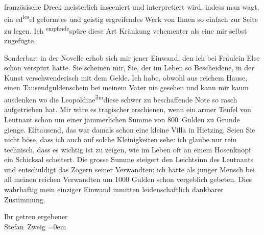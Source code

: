               französische Dreck meisterlich insceniert und interpretiert wird, indess man wagt,
               ein ed\substVorne{}\textsuperscript{les}\substDazwischen{}el\substHinten{} geformtes und geistig ergreifendes Werk von Ihnen so einfach zur Seite zu
               legen. Ich \substVorne{}\textsuperscript{empfinde}\substDazwischen{}spüre\substHinten{} diese Art Kränkung vehementer als eine mir selbst zugefügte.\pend
           
\pstart
           Sonderbar: in der Novelle
               erhob sich mir jener Einwand, den ich bei Fräulein
                  Else schon verspürt hatte. Sie scheinen mir, Sie, der im Leben so
               Bescheidene, in der Kunst verschwenderisch mit dem Gelde. Ich habe, obwohl aus
               reichem Hause, einen Tausendguldenschein \introOben{}bei meinem Vater\introOben{}
               nie gesehen und kann mir kaum ausdenken wo die Leopoldine\substVorne{}\textsuperscript{ihn}\substDazwischen{}diese schwer zu beschaffende Note so rasch\substHinten{} aufgetrieben hat. Mir wäre es tragischer erschienen, wenn ein armer Teufel
               von Leutnant schon um einer jämmerlichen Summe von 800 Gulden zu Grunde gienge.
               Elftausend, das war damals schon eine \introOben{}kleine\introOben{} Villa in Hietzing. Seien Sie nicht böse, dass ich \introOben{}auch\introOben{} auf solche Kleinigkeiten
               sehe: ich glaube nur rein technisch, dass es wichtig ist zu zeigen, wie im Leben oft
               an einem Hosenknopf ein Schicksal scheitert. Die grosse Summe steigert den Leichtsinn
               des Leutnants und entschuldigt das Zögern seiner Verwandten: ich hätte als junger
               Mensch bei all meinen reichen Verwandten um 1000 Gulden schon vergeblich gebeten.
               Dies wahrhaftig mein einziger Einwand inmitten leidenschaftlich dankbarer
               Zustimmung.\pend
           
\pstart
           Ihr getreu ergebener{\\[\baselineskip]}\spacefill\mbox{Stefan Zweig}\pend
           \leftskip=0em{}\endnumbering{}  \newcommand{\dateiname}{L03674}\newcommand{\titel}{Stefan Zweig an Arthur Schnitzler, 18. 5. 1927}\newcommand{\editorInnen}{Selma Jahnke und Martin Anton Müller}
